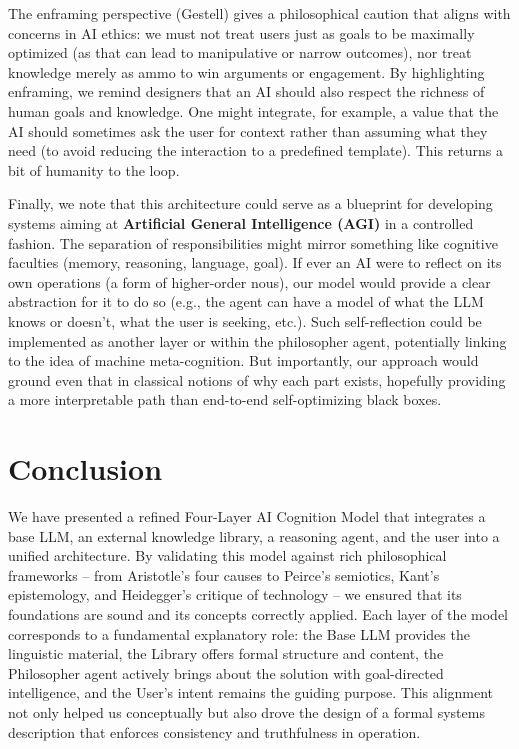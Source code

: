 \documentclass{article}
\begin{document}
The enframing perspective (Gestell) gives a philosophical caution that aligns with concerns in AI ethics: we must not treat users just as goals to be maximally optimized (as that can lead to manipulative or narrow outcomes), nor treat knowledge merely as ammo to win arguments or engagement. By highlighting enframing, we remind designers that an AI should also respect the richness of human goals and knowledge. One might integrate, for example, a value that the AI should sometimes ask the user for context rather than assuming what they need (to avoid reducing the interaction to a predefined template). This returns a bit of humanity to the loop.

Finally, we note that this architecture could serve as a blueprint for developing systems aiming at \textbf{Artificial General Intelligence (AGI)} in a controlled fashion. The separation of responsibilities might mirror something like cognitive faculties (memory, reasoning, language, goal). If ever an AI were to reflect on its own operations (a form of higher-order nous), our model would provide a clear abstraction for it to do so (e.g., the agent can have a model of what the LLM knows or doesn't, what the user is seeking, etc.). Such self-reflection could be implemented as another layer or within the philosopher agent, potentially linking to the idea of machine meta-cognition. But importantly, our approach would ground even that in classical notions of why each part exists, hopefully providing a more interpretable path than end-to-end self-optimizing black boxes.

\section{Conclusion}\label{sec:conclusion}
We have presented a refined Four-Layer AI Cognition Model that integrates a base LLM, an external knowledge library, a reasoning agent, and the user into a unified architecture. By validating this model against rich philosophical frameworks – from Aristotle's four causes to Peirce's semiotics, Kant's epistemology, and Heidegger's critique of technology – we ensured that its foundations are sound and its concepts correctly applied. Each layer of the model corresponds to a fundamental explanatory role: the Base LLM provides the linguistic material, the Library offers formal structure and content, the Philosopher agent actively brings about the solution with goal-directed intelligence, and the User's intent remains the guiding purpose. This alignment not only helped us conceptually but also drove the design of a formal systems description that enforces consistency and truthfulness in operation.
\end{document}
